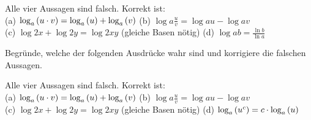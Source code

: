 \documentclass[11pt]{exam}
\begin{document}
\begin{questions}
{\begin{solution}
		Alle vier Aussagen sind falsch. Korrekt ist:\\
		(a) $\log{a}{u\*v}=\log{a}{u}+\log{a}{v}$ \quad (b) $\log{a}{\frac{u}{v}}=\log{a}{u}-\log{a}{v}$\\
		(c) $\log{2}{x}+\log{2}{y}=\log{2}{xy}$ (gleiche Basen nötig) \quad (d) $\log{a}{b}=\frac{\ln{b}}{\ln{a}}$
\end{solution}}
{}

\question[4]
Begründe, welche der folgenden Ausdrücke wahr sind und korrigiere die falschen Aussagen.
{\begin{solution}
		Alle vier Aussagen sind falsch. Korrekt ist:\\
		(a) $\log{a}{u\*v}=\log{a}{u}+\log{a}{v}$ \quad (b) $\log{a}{\frac{u}{v}}=\log{a}{u}-\log{a}{v}$\\
		(c) $\log{2}{x}+\log{2}{y}=\log{2}{xy}$ (gleiche Basen nötig) \quad (d) $\log{a}{u^c}=c\*\log{a}{u}$
\end{solution}}
{}


\end{questions}
\end{document}

